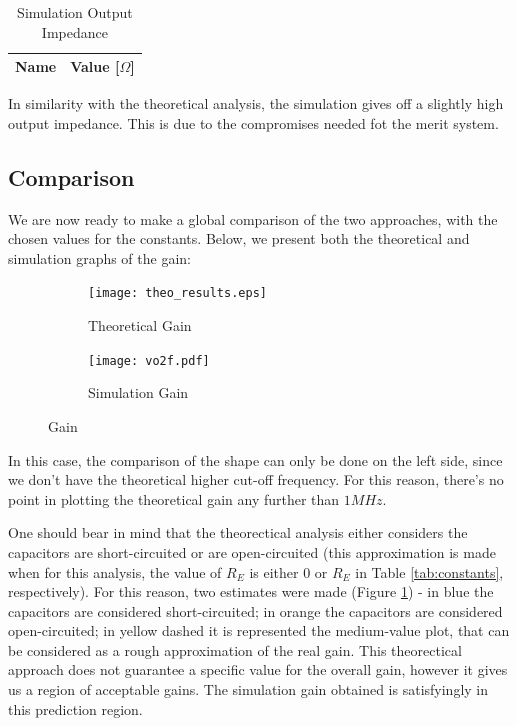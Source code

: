 \begin{table}[h]
    \centering
    \begin{tabular}{|l|c|}
    \hline
    {\bf Name} & {\bf Value [$\Omega$]} \\ \hline
    
    \end{tabular}
    \caption{Simulation Output Impedance}
    \label{tab:simulation_output_imp}
\end{table}

In similarity with the theoretical analysis, the simulation gives off a slightly high output impedance. This is due to the compromises needed fot the merit system.
\pagebreak

\subsection{Comparison}
\label{subsec:comparison}

We are now ready to make a global comparison of the two approaches, with the chosen values for the constants. Below, we present both the theoretical and simulation graphs of the gain:

\vspace{-2.5cm}

\begin{figure}[h]
\centering
\begin{subfigure}{.5\textwidth}
    \centering
    \vspace{2.8 cm}
    \texttt{[image: theo\_results.eps]}
    \caption{Theoretical Gain}
\end{subfigure}%
\begin{subfigure}{.5\textwidth}
    \centering
    \texttt{[image: vo2f.pdf]}
    \caption{Simulation Gain}
\end{subfigure}
\caption{Gain}
\label{fig:Gain}
\end{figure}

In this case, the comparison of the shape can only be done on the left side, since we don't have the theoretical higher cut-off frequency. For this reason, there's no point in plotting the theoretical gain any further than $1 MHz$.

One should bear in mind that the theorectical analysis either considers the capacitors are short-circuited or are open-circuited (this approximation is made when for this analysis, the value of $R_E$ is either $0$ or $R_E$ in Table \ref{tab:constants}, respectively). For this reason, two estimates were made (Figure \ref{fig:Gain}) - in blue the capacitors are considered short-circuited; in orange the capacitors are considered open-circuited; in yellow dashed it is represented the medium-value plot, that can be considered as a rough approximation of the real gain. This theorectical approach does not guarantee a specific value for the overall gain, however it gives us a region of acceptable gains. The simulation gain obtained is satisfyingly in this prediction region. 

